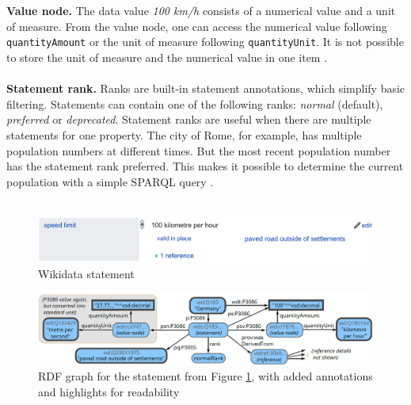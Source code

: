 ﻿\documentclass[11pt,titlepage,oneside,openany]{book}
\begin{document}
\\
\\
\textbf{Value node. } The data value \textit{100 km/h} consists of a numerical value and a unit of measure. From the value node, one can access the numerical value following \texttt{quantityAmount} or the unit of measure following \texttt{quantityUnit}. It is not possible to store the unit of measure and the numerical value in one item \cite{Malyshev2018GettingTM}.
\\
\\
\textbf{Statement rank. } Ranks are built-in statement annotations, which simplify basic filtering. Statements can contain one of the following ranks: \textit{normal} (default), \textit{preferred} or \textit{deprecated}. Statement ranks are useful when there are multiple statements for one property. The city of Rome, for example, has multiple population numbers at different times. But the most recent population number has the statement rank preferred. This makes it possible to determine the current population with a simple SPARQL query \cite{Malyshev2018GettingTM}.
\\
\\

\begin{figure}
	\begin{center}
	\includegraphics[width=13cm]{./figures/wikidata-statement.png}
	\caption[Wikidata statement]{Wikidata statement \cite{Malyshev2018GettingTM}}
	\label{fig:wikidata-statement}
	\end{center}
\end{figure}
\begin{figure}
	\begin{center}
	\includegraphics[width=13cm]{./figures/rdf-graph-wikidata-statement.png}
	\caption[RDF graph for Wikidata statement]{RDF graph for the statement from Figure \ref{fig:wikidata-statement}, with added annotations and highlights for readability \cite{Malyshev2018GettingTM}}
	\label{fig:rdf-graph-wikidata-statement}
	\end{center}
\end{figure}
\end{document}
